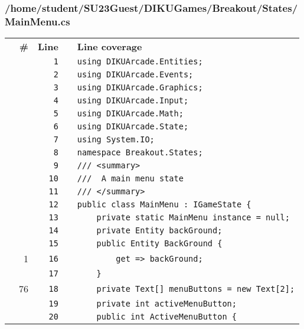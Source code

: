 \documentclass[a4paper,landscape,10pt]{article}
\begin{document}
\subsubsection{/home/student/SU23Guest/DIKUGames/Breakout/States/MainMenu.cs}
\begin{longtable}[l]{lrrll}
\textbf{} & \textbf{\#} & \textbf{Line} & \textbf{} & \textbf{Line coverage}\\
\cellcolor{gray} &  & \verb~1~ & & \verb~using DIKUArcade.Entities;~\\
\cellcolor{gray} &  & \verb~2~ & & \verb~using DIKUArcade.Events;~\\
\cellcolor{gray} &  & \verb~3~ & & \verb~using DIKUArcade.Graphics;~\\
\cellcolor{gray} &  & \verb~4~ & & \verb~using DIKUArcade.Input;~\\
\cellcolor{gray} &  & \verb~5~ & & \verb~using DIKUArcade.Math;~\\
\cellcolor{gray} &  & \verb~6~ & & \verb~using DIKUArcade.State;~\\
\cellcolor{gray} &  & \verb~7~ & & \verb~using System.IO;~\\
\cellcolor{gray} &  & \verb~8~ & & \verb~namespace Breakout.States;~\\
\cellcolor{gray} &  & \verb~9~ & & \verb~/// <summary>~\\
\cellcolor{gray} &  & \verb~10~ & & \verb~///  A main menu state~\\
\cellcolor{gray} &  & \verb~11~ & & \verb~/// </summary>~\\
\cellcolor{gray} &  & \verb~12~ & & \verb~public class MainMenu : IGameState {~\\
\cellcolor{gray} &  & \verb~13~ & & \verb~    private static MainMenu instance = null;~\\
\cellcolor{gray} &  & \verb~14~ & & \verb~    private Entity backGround;~\\
\cellcolor{gray} &  & \verb~15~ & & \verb~    public Entity BackGround {~\\
\cellcolor{green} & 1 & \verb~16~ & & \verb~        get => backGround;~\\
\cellcolor{gray} &  & \verb~17~ & & \verb~    }~\\
\cellcolor{green} & 76 & \verb~18~ & & \verb~    private Text[] menuButtons = new Text[2];~\\
\cellcolor{gray} &  & \verb~19~ & & \verb~    private int activeMenuButton;~\\
\cellcolor{gray} &  & \verb~20~ & & \verb~    public int ActiveMenuButton {~\\

\end{longtable}
\end{document}

